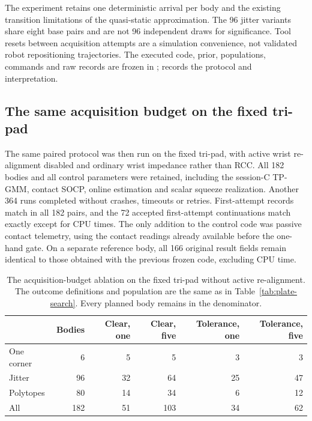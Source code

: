 The experiment retains one deterministic arrival per body and the existing transition limitations of the quasi-static approximation. The 96 jitter variants share eight base pairs and are not 96 independent draws for significance. Tool resets between acquisition attempts are a simulation convenience, not validated robot repositioning trajectories. The executed code, prior, populations, commands and raw records are frozen in ;  records the protocol and interpretation.

\subsection{The same acquisition budget on the fixed tri-pad}

The same paired protocol was then run on the fixed tri-pad, with active wrist re-alignment disabled and ordinary wrist impedance rather than RCC. All 182 bodies and all control parameters were retained, including the session-C TP-GMM, contact SOCP, online estimation and scalar squeeze realization. Another 364 runs completed without crashes, timeouts or retries. First-attempt records match in all 182 pairs, and the 72 accepted first-attempt continuations match exactly except for CPU times. The only addition to the control code was passive contact telemetry, using the contact readings already available before the one-hand gate. On a separate reference body, all 166 original result fields remain identical to those obtained with the previous frozen code, excluding CPU time.

\begin{table}[htbp]\centering\small
\begin{tabular}{@{}lrrrrr@{}}\toprule
 & Bodies & Clear, one & Clear, five & Tolerance, one & Tolerance, five\\
\midrule
One corner & 6 & 5 & 5 & 3 & 3\\
Jitter & 96 & 32 & 64 & 25 & 47\\
Polytopes & 80 & 14 & 34 & 6 & 12\\
All & 182 & 51 & 103 & 34 & 62\\
\bottomrule\end{tabular}
\caption{The acquisition-budget ablation on the fixed tri-pad without active re-alignment. The outcome definitions and population are the same as in Table~\ref{tab:plate-search}. Every planned body remains in the denominator.}
\label{tab:fixed-search}
\end{table}

